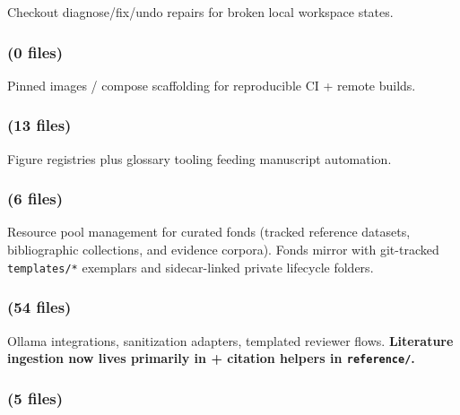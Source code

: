 \documentclass[
  english,
]{article}
\begin{document}
Checkout diagnose/fix/undo repairs for broken local workspace states.

\subsubsection{\texorpdfstring{ (0
files)}{infrastructure.docker (0 files)}}\label{infrastructure.docker-0-files}

Pinned images / compose scaffolding for reproducible CI + remote builds.

\subsubsection{\texorpdfstring{ (13
files)}{infrastructure.documentation (13 files)}}\label{infrastructure.documentation-13-files}

Figure registries plus glossary tooling feeding manuscript automation.

\subsubsection{\texorpdfstring{ (6
files)}{infrastructure.fonds (6 files)}}\label{infrastructure.fonds-6-files}

Resource pool management for curated fonds (tracked reference datasets,
bibliographic collections, and evidence corpora). Fonds mirror
 with git-tracked \texttt{templates/*}
exemplars and sidecar-linked private lifecycle folders.

\subsubsection{\texorpdfstring{ (54
files)}{infrastructure.llm (54 files)}}\label{infrastructure.llm-54-files}

Ollama integrations, sanitization adapters, templated reviewer flows.
\textbf{Literature ingestion now lives primarily in
 + citation helpers in \texttt{reference/}.}

\subsubsection{\texorpdfstring{ (5
files)}{infrastructure.methods (5 files)}}\label{infrastructure.methods-5-files}
\end{document}
